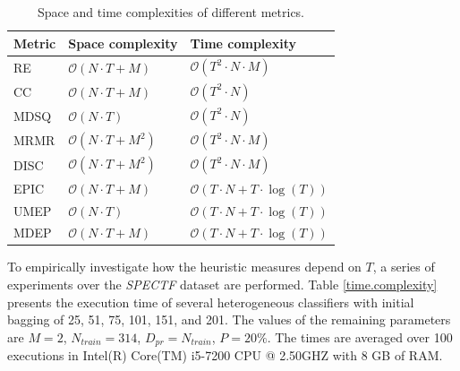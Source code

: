 \begin{table}[!ht]
\centering \scriptsize
 \caption{Space and time complexities of different metrics.}
\label{complexity}
\renewcommand{\arraystretch}{1.3}
\begin{adjustbox}{max width=1\textwidth}
\begin{tabular}{l|l|l}
\hline
Metric & Space complexity & Time complexity\\ \hline
RE& $\mathcal{O}( N \cdot T + M) $ &$\mathcal{O}( T^2 \cdot N \cdot M) $\\
CC& $\mathcal{O}( N \cdot T + M) $ &$\mathcal{O}( T^2 \cdot N) $\\
MDSQ& $\mathcal{O}( N \cdot T ) $ &$\mathcal{O}( T^2 \cdot N) $\\
MRMR& $\mathcal{O}( N \cdot T + M^2)$ &$\mathcal{O}( T^2 \cdot N \cdot M) $\\
DISC& $\mathcal{O}( N \cdot T + M^2)$ &$\mathcal{O}( T^2 \cdot N \cdot M) $\\
EPIC& $\mathcal{O}( N \cdot T + M)$ &$\mathcal{O}(T \cdot N + T \cdot \log{}(T))$\\
UMEP& $\mathcal{O}( N \cdot T ) $ &$\mathcal{O}(T \cdot N+ T \cdot \log{}(T))$\\
MDEP&$\mathcal{O}( N \cdot T + M)$ &$\mathcal{O}(T \cdot N + T \cdot \log{}(T))$\\

\hline
\end{tabular}
\end{adjustbox}
\end{table}




To empirically investigate how the heuristic measures depend on $T$, a series of experiments over the \textit{SPECTF} dataset are performed. Table \ref{time.complexity} presents the execution time of several heterogeneous classifiers with initial bagging of 25, 51, 75, 101, 151, and 201. The values of the remaining parameters are $M=2$, $N_{train}=314$, $D_{pr}=N_{train}$, $P=20\%$. The times are averaged over 100 executions in Intel(R) Core(TM) i5-7200 CPU @ 2.50GHZ with 8 GB of RAM. 


